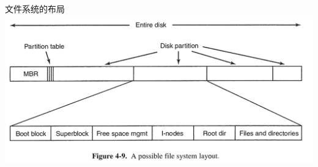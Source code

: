 \documentclass[xcolor=svgnames]{beamer}
\begin{document}
\begin{CJK*}{UTF8}{gbsn}
\begin{frame}{文件系统的布局}
\includegraphics[width=1.0\textwidth]{layout.png}
\end{frame}




%

%


\end{CJK*}
\end{document}

